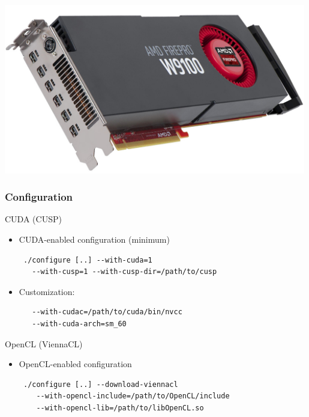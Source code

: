 \begin{frame}[fragile]
\begin{minipage}{0.23\textwidth}
 \includegraphics[width=0.99\textwidth]{figures/w9100.jpg} \\[1.5em]
 \end{minipage}


\end{frame}


\begin{frame}[fragile]
\frametitle{Configuration}
  \begin{block}{CUDA (CUSP)}
    \begin{itemize}
     \item CUDA-enabled configuration (minimum)
     \begin{lstlisting}
 ./configure [..] --with-cuda=1
   --with-cusp=1 --with-cusp-dir=/path/to/cusp
     \end{lstlisting}
     \item Customization:
     \begin{lstlisting}
   --with-cudac=/path/to/cuda/bin/nvcc
   --with-cuda-arch=sm_60
     \end{lstlisting}
    \end{itemize}
  \end{block}
  
  \begin{block}{OpenCL (ViennaCL)}
    \begin{itemize}
     \item OpenCL-enabled configuration
     \begin{lstlisting}
 ./configure [..] --download-viennacl
    --with-opencl-include=/path/to/OpenCL/include
    --with-opencl-lib=/path/to/libOpenCL.so
     \end{lstlisting}
    \end{itemize}
  \end{block}
\end{frame}


